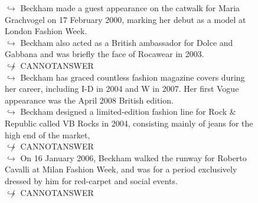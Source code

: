 \documentclass[11pt,a4paper, onecolumn]{article}
\begin{document}
\begin{figure}[t] \small \begin{tcolorbox}[boxsep=0pt,left=5pt,right=0pt,top=2pt,colback = yellow!5] \begin{dialogue}
 \small 
\colorbox{pink!25}{$\hookrightarrow$}
{ Beckham made a guest appearance on the catwalk for Maria Grachvogel on 17 February 2000, marking her debut as a model at London Fashion Week. }
\\
\colorbox{pink!25}{$\hookrightarrow$}
{ Beckham also acted as a British ambassador for Dolce and Gabbana and was briefly the face of Rocawear in 2003. }
\\
\colorbox{pink!25}{$\not\hookrightarrow$}
{ CANNOTANSWER }
\\
\colorbox{pink!25}{$\hookrightarrow$}
{ Beckham has graced countless fashion magazine covers during her career, including I-D in 2004 and W in 2007. Her first Vogue appearance was the April 2008 British edition. }
\\
\colorbox{pink!25}{$\hookrightarrow$}
{ Beckham designed a limited-edition fashion line for Rock & Republic called VB Rocks in 2004, consisting mainly of jeans for the high end of the market, }
\\
\colorbox{pink!25}{$\not\hookrightarrow$}
{ CANNOTANSWER }
\\
\colorbox{pink!25}{$\hookrightarrow$}
{ On 16 January 2006, Beckham walked the runway for Roberto Cavalli at Milan Fashion Week, and was for a period exclusively dressed by him for red-carpet and social events. }
\\
\colorbox{pink!25}{$\not\hookrightarrow$}
{ CANNOTANSWER }
 \end{dialogue}\end{tcolorbox}\end{figure}
\end{document}
